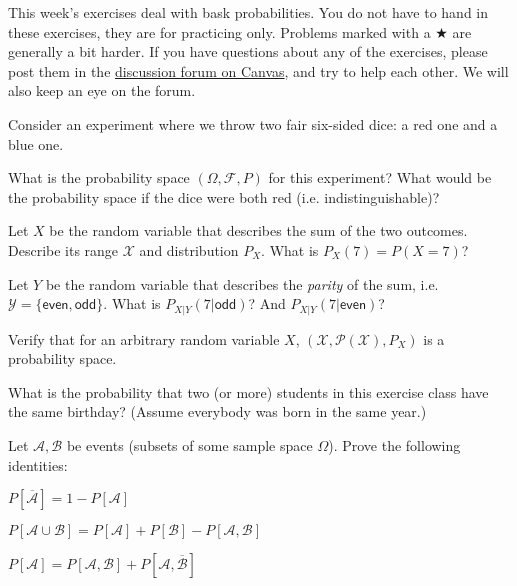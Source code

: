 \documentclass[a4paper,10pt,landscape,twocolumn]{scrartcl}
\begin{document}
\practiceproblems

{\sffamily\noindent
This week's exercises deal with bask probabilities.
You do not have to hand in these exercises, they are for practicing only. Problems marked with a $\bigstar$ are generally a bit harder. If you have questions about any of the exercises, please post them in the \href{https://canvas.uva.nl/courses/2205/discussion_topics/22948?module_item_id=130884}{discussion forum on Canvas}, and try to help each other. We will also keep an eye on the forum.
}

\enlargethispage{1cm}
\begin{exercise}
Consider an experiment where we throw two fair six-sided dice: a red one and a blue one.
	\begin{subex}
	What is the probability space $(\Omega,\mathcal{F},P)$ for this experiment? What would be the probability space if the dice were both red (i.e. indistinguishable)?
	\end{subex}
	\begin{subex}
	Let $X$ be the random variable that describes the sum of the two outcomes. Describe its range $\mathcal{X}$ and distribution $P_X$. What is $P_X(7) = P(X=7)$?
	\end{subex}
	\begin{subex}
	Let $Y$ be the random variable that describes the \emph{parity} of the sum, i.e. $\mathcal{Y} = \{\mathsf{even}, \mathsf{odd}\}$. What is $P_{X|Y}(7|\mathsf{odd})$? And $P_{X|Y}(7|\mathsf{even})$?
	\end{subex}
	\begin{subex}
	Verify that for an arbitrary random variable $X$, $(\mathcal{X},\mathcal{P}(\mathcal{X}),P_X)$ is a probability space.
	\end{subex}
\end{exercise}

\begin{exercise}
What is the probability that two (or more) students in this exercise class have the same birthday? (Assume everybody was born in the same year.)
\end{exercise}

\begin{exercise}[Events]
Let $\mathcal{A}, \mathcal{B}$ be events (subsets of some sample space $\Omega$). Prove the following identities:
	\begin{subex}
	$P[\overline{\mathcal{A}}] = 1 - P[\mathcal{A}]$
	\end{subex}
	
	\begin{subex}
	$P[\mathcal{A} \cup \mathcal{B}] = P[\mathcal{A}] + P[\mathcal{B}] - P[\mathcal{A},\mathcal{B}]$
	\end{subex}
	
	\begin{subex}
	$P[\mathcal{A}] = P[\mathcal{A},\mathcal{B}] + P[\mathcal{A},\overline{\mathcal{B}}]$
	\end{subex}
\end{exercise}
\end{document}
